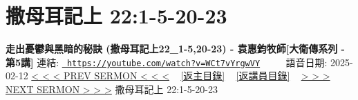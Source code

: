 \documentclass{book}
\begin{document}
\section{撒母耳記上 22:1-5-20-23}
\label{sec:WCt7vYrgwVY}
\textbf{走出憂鬱與黑暗的秘訣 (撒母耳記上22\_1-5,20-23) - 袁惠鈞牧師[大衛傳系列 - 第5講]}
\newline
\newline
連結: \href{https://youtube.com/watch?v=WCt7vYrgwVY}{\texttt{ https://youtube.com/watch?v=WCt7vYrgwVY}} ~~~~ 語音日期: 2025-02-12 
\newline
\newline
\hyperref[sec:rN0dS2BBBmc]{< < < PREV SERMON < < <}
~
\hyperlink{toc}{[返主目錄]}
~
\hyperref[ch:preacher10]{[返講員目錄]}
~
\hyperref[sec:GqTOPwqfjwM]{> > > NEXT SERMON > > >}
\newline
\newline
撒母耳記上 22:1-5-20-23
\newline
\end{document}

